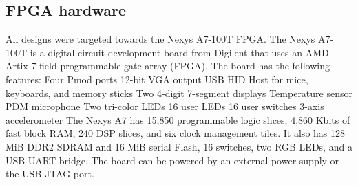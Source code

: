 \documentclass{article}
\begin{document}
        \subsection{FPGA hardware} 
All designs were targeted towards the Nexys A7-100T FPGA.
The Nexys A7-100T is a digital circuit development board from Digilent that uses an AMD Artix 7 field programmable gate array (FPGA). The board has the following features: Four Pmod ports 12-bit VGA output USB HID Host for mice, keyboards, and memory sticks Two 4-digit 7-segment displays Temperature sensor PDM microphone Two tri-color LEDs 16 user LEDs 16 user switches 3-axis accelerometer The Nexys A7 has 15,850 programmable logic slices, 4,860 Kbits of fast block RAM, 240 DSP slices, and six clock management tiles. It also has 128 MiB DDR2 SDRAM and 16 MiB serial Flash, 16 switches, two RGB LEDs, and a USB-UART bridge. The board can be powered by an external power supply or the USB-JTAG port. 
\end{document}
